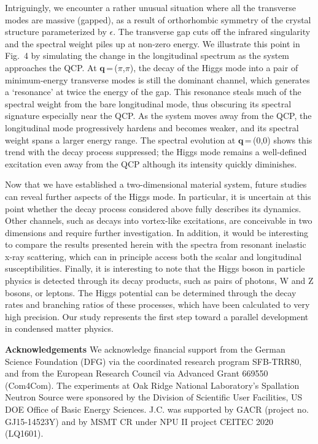 \documentclass[twocolumn,prb,aps,showpacs]{revtex4-1}
\begin{document}
Intriguingly, we encounter a rather unusual situation where all the transverse modes are massive (gapped), as a result of orthorhombic symmetry of the crystal structure parameterized by $\epsilon$. The transverse gap cuts off the infrared singularity and the spectral weight piles up at non-zero energy. We illustrate this point in Fig.~4 by simulating the change in the longitudinal spectrum as the system approaches the QCP. At $\mathbf{q}$\,=\,($\pi$,$\pi$), the decay of the Higgs mode into a pair of minimum-energy transverse modes is still the dominant channel, which generates a `resonance' at twice the energy of the gap. This resonance steals much of the spectral weight from the bare longitudinal mode, thus obscuring its spectral signature especially near the QCP. %
As the system moves away from the QCP, the longitudinal mode progressively hardens and becomes weaker, and its spectral weight spans a larger energy range. The spectral evolution at $\mathbf{q}$\,=\,(0,0) shows this trend with the decay process suppressed; the Higgs mode remains a well-defined excitation even away from the QCP although its intensity quickly diminishes.

Now that we have established a two-dimensional material system, future studies can reveal further aspects of the Higgs mode. In particular, it is uncertain at this point whether the decay process considered above fully describes its dynamics. Other  channels, such as decays into vortex-like excitations, are conceivable in two dimensions and require further investigation. In addition, it would be interesting to compare the results presented herein with the spectra from resonant inelastic x-ray scattering, which can in principle access both the scalar and longitudinal susceptibilities. Finally, it is interesting to note that the Higgs boson in particle physics is detected through its decay products, such as pairs of photons, W and Z bosons, or leptons. The Higgs potential can be determined through the decay rates and branching ratios of these processes, which have been calculated to very high precision. Our study represents the first step toward a parallel development in condensed matter physics. 



\vspace {20 pt}
\noindent
{\bf Acknowledgements} We acknowledge financial support from the German Science Foundation (DFG) via the coordinated research program SFB-TRR80, and from the European Research Council via Advanced Grant 669550 (Com4Com). The experiments at Oak Ridge National Laboratory's Spallation Neutron Source were sponsored by the Division of Scientific User Facilities, US DOE Office of Basic Energy Sciences. J.C. was supported by GACR (project no. GJ15-14523Y) and by MSMT CR under NPU II project CEITEC 2020 (LQ1601).
\end{document}

